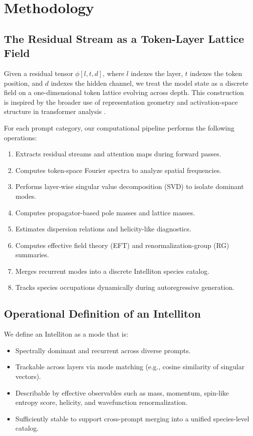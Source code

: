 \documentclass[11pt]{article}
\begin{document}
\section{Methodology}
\subsection{The Residual Stream as a Token-Layer Lattice Field}
Given a residual tensor $\phi[l,t,d]$, where $l$ indexes the layer, $t$ indexes the token position, and $d$ indexes the hidden channel, we treat the model state as a discrete field on a one-dimensional token lattice evolving across depth. This construction is inspired by the broader use of representation geometry and activation-space structure in transformer analysis \citep{voita2023neural,belrose2023leace}.

For each prompt category, our computational pipeline performs the following operations:
\begin{enumerate}[leftmargin=1.5em]
    \item Extracts residual streams and attention maps during forward passes.
    \item Computes token-space Fourier spectra to analyze spatial frequencies.
    \item Performs layer-wise singular value decomposition (SVD) to isolate dominant modes.
    \item Computes propagator-based pole masses and lattice masses.
    \item Estimates dispersion relations and helicity-like diagnostics.
    \item Computes effective field theory (EFT) and renormalization-group (RG) summaries.
    \item Merges recurrent modes into a discrete Intelliton species catalog.
    \item Tracks species occupations dynamically during autoregressive generation.
\end{enumerate}

\subsection{Operational Definition of an Intelliton}
We define an Intelliton as a mode that is:
\begin{itemize}[leftmargin=1.5em]
    \item Spectrally dominant and recurrent across diverse prompts.
    \item Trackable across layers via mode matching (e.g., cosine similarity of singular vectors).
    \item Describable by effective observables such as mass, momentum, spin-like entropy score, helicity, and wavefunction renormalization.
    \item Sufficiently stable to support cross-prompt merging into a unified species-level catalog.
\end{itemize}
\end{document}

